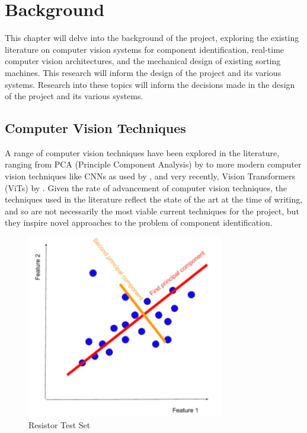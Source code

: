 \section{Background}
\label{sec:background}
This chapter will delve into the background of the project, exploring the existing literature on computer vision systems for component identification, real-time computer vision architectures, and the mechanical design of existing sorting machines. This research will inform the design of the project and its various systems. Research into these topics will inform the decisions made in the design of the project and its various systems.

\subsection{Computer Vision Techniques}
A range of computer vision techniques have been explored in the literature, ranging from PCA (Principle Component Analysis) by \citet{Dhenge2013MechanicalNS} to more modern computer vision techniques like CNNs as used by \citet{Xu2020,s22239079}, and very recently, Vision Transformers (ViTs) by \citet{dosovitskiy2021image}. Given the rate of advancement of computer vision techniques, the techniques used in the literature reflect the state of the art at the time of writing, and so are not necessarily the most viable current techniques for the project, but they inspire novel approaches to the problem of component identification.

\begin{figure}[H]
  \hfill
  \begin{minipage}[t]{\textwidth}
    \centering
    \includegraphics[height=8cm]{imgs/articles/pca.jpg}
    \caption{Resistor Test Set \cite{pcaexplained}}
    \label{fig:pca}
  \end{minipage}
\end{figure}

